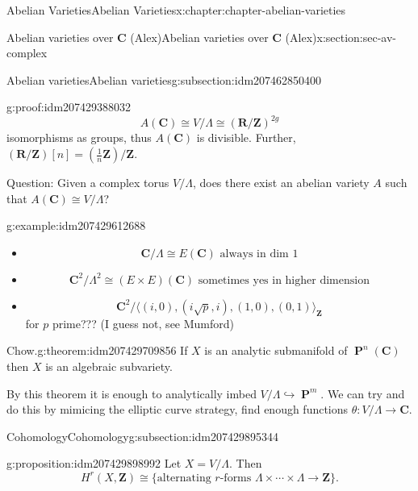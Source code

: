 \documentclass[oneside,10pt,]{book}
\numberwithin{equation}{section}
\newcommand{\lb}{[}
\newcommand{\rb}{]}
\newcommand{\ZZ}{\mathbf{Z}}
\newcommand{\RR}{\mathbf{R}}
\newcommand{\CC}{\mathbf{C}}
\DeclareMathOperator{\PP}{\mathbf{P}}
\begin{document}
\begin{chapterptx}{Abelian Varieties}{}{Abelian Varieties}{}{}{x:chapter:chapter-abelian-varieties}
\begin{sectionptx}{Abelian varieties over \(\CC\) (Alex)}{}{Abelian varieties over \(\CC\) (Alex)}{}{}{x:section:sec-av-complex}
\begin{subsectionptx}{Abelian varieties}{}{Abelian varieties}{}{}{g:subsection:idm207462850400}
\begin{proofptx}{}{g:proof:idm207429388032}
%
\begin{equation*}
A(\CC)  \cong V/\Lambda \cong (\RR/\ZZ)^{2g}
\end{equation*}
isomorphisms as groups, thus \(A(\CC)\) is divisible. Further, \((\RR/\ZZ)\lb n \rb = (\frac 1n \ZZ)/\ZZ\).%
\end{proofptx}
Question: Given a complex torus \(V/\Lambda\), does there exist an abelian variety \(A\) such that \(A(\CC) \cong V/\Lambda\)?%
\begin{example}{}{g:example:idm207429612688}%
%
\begin{itemize}[label=\textbullet]
\item{}%
\begin{equation*}
\CC/\Lambda \cong E(\CC) \text{ always in dim 1}
\end{equation*}
%
\item{}%
\begin{equation*}
\CC^2/\Lambda^2 \cong (E\times E)(\CC) \text{ sometimes yes in higher dimension}
\end{equation*}
%
\item{}%
\begin{equation*}
\CC^2/\langle (i, 0), (i\sqrt p, i), (1, 0), (0, 1)\rangle_\ZZ
\end{equation*}
for \(p\) prime??? (I guess not, see Mumford)%
\end{itemize}
%
\end{example}
\begin{theorem}{Chow.}{}{g:theorem:idm207429709856}%
If \(X\) is an analytic submanifold of \(\PP^n(\CC)\) then \(X\) is an algebraic subvariety.%
\end{theorem}
By this theorem it is enough to analytically imbed \(V/\Lambda \hookrightarrow \PP^m\). We can try and do this by mimicing the elliptic curve strategy, find enough functions \(\theta \colon V/\Lambda \to \CC\).%
\end{subsectionptx}
%
%
\typeout{************************************************}
\typeout{************************************************}
%
\begin{subsectionptx}{Cohomology}{}{Cohomology}{}{}{g:subsection:idm207429895344}
\begin{proposition}{}{}{g:proposition:idm207429898992}%
Let \(X = V/\Lambda\). Then%
\begin{equation*}
H^r (X,\ZZ) \cong \{\text{alternating }r\text{-forms } \Lambda\times\cdots\times\Lambda\to \ZZ\}\text{.}
\end{equation*}

\end{proposition}
\end{subsectionptx}
\end{sectionptx}
\end{chapterptx}
\end{document}
